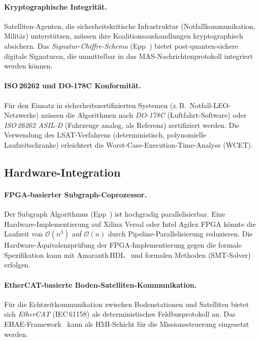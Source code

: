 ﻿\documentclass[a4paper,12pt]{article}
\theoremstyle{definition}
\begin{document}
\paragraph{Kryptographische Integrit\"at.}
Satelliten-Agenten, die sicherheitskritische Infrastruktur (Notfallkommunikation,
Milit\"ar) unterst\"utzen, m\"ussen ihre Koalitionsaushandlungen kryptographisch
absichern. Das \emph{Signatur-Chiffre-Schema} (Epp~\cite{EppSigChiffre})
bietet post-quanten-sichere digitale Signaturen, die unmittelbar in das
MAS-Nachrichtenprotokoll integriert werden k\"onnen.

\paragraph{ISO\,26262 und DO-178C Konformit\"at.}
F\"ur den Einsatz in sicherheitszertifizierten Systemen
(z.\,B.\ Notfall-LEO-Netzwerke) m\"ussen die Algorithmen
nach \emph{DO-178C} (Luftfahrt-Software) oder
\emph{ISO\,26262 ASIL-D} (Fahrzeuge analog, als Referenz)
zertifiziert werden.
Die Verwendung des LSAT-Verfahrens (deterministisch, polynomielle
Laufzeitschranke) erleichtert die Worst-Case-Execution-Time-Analyse (WCET).

\subsection{Hardware-Integration}

\paragraph{FPGA-basierter Subgraph-Coprozessor.}
Der Subgraph Algorithmus (Epp~\cite{Epp2026}) ist hochgradig parallelisierbar.
Eine Hardware-Implementierung auf Xilinx Versal oder Intel Agilex FPGA
k\"onnte die Laufzeit von $\mathcal{O}(n^3)$ auf $\mathcal{O}(n)$
durch Pipeline-Parallelisierung reduzieren.
Die Hardware-\"Aquivalenzpr\"ufung der FPGA-Implementierung gegen die formale
Spezifikation kann mit Amaranth\,HDL~\cite{AmaranthHDL} und formalen
Methoden (SMT-Solver) erfolgen.

\paragraph{EtherCAT-basierte Boden-Satelliten-Kommunikation.}
F\"ur die Echtzeitkommunikation zwischen Bodenstationen und Satelliten
bietet sich \emph{EtherCAT} (IEC\,61158) als deterministisches Feldbusprotokoll
an. Das EHAE-Framework~\cite{EppEHAE} kann als HMI-Schicht f\"ur die
Missionssteuerung eingesetzt werden.
\end{document}
